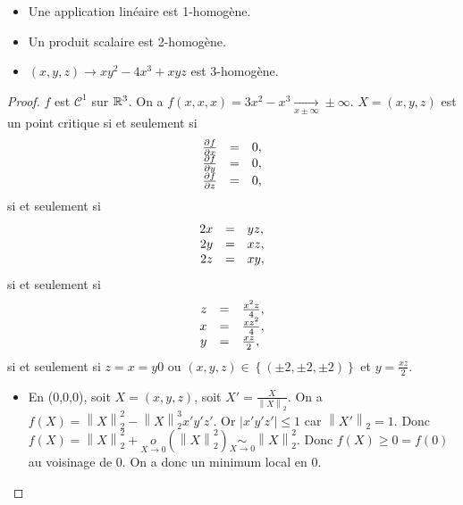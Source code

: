 \documentclass[12pt]{article}
\begin{document}
\begin{remark}
	\phantom{}
	\begin{itemize}
		\item Une application linéaire est 1-homogène.
		\item Un produit scalaire est 2-homogène.
		\item $(x,y,z)\to xy^{2}-4x^{3}+xyz$ est 3-homogène.
	\end{itemize}
\end{remark}

\begin{proof}
	$f$ est $\mathcal{C}^{1}$ sur $\mathbb{R}^{3}$. On a $f(x,x,x)=3x^{2}-x^{3}\xrightarrow[x\pm\infty]{}\pm\infty$. $X=(x,y,z)$ est un point critique si et seulement si 
	\begin{equation}
		\begin{array}[]{rcl}
			\frac{\partial f}{\partial x}&=&0,\\
			\frac{\partial f}{\partial y}&=&0,\\
			\frac{\partial f}{\partial z}&=&0,
		\end{array}
	\end{equation}
	si et seulement si 
	\begin{equation}
		\begin{array}[]{rcl}
			2x &=& yz,\\
			2y &=& xz,\\
			2z &=& xy,			
		\end{array}
	\end{equation}
	si et seulement si 
	\begin{equation}
		\begin{array}[]{rcl}
			z&=&\frac{x^{2}z}{4},\\
			x&=&\frac{xz^{2}}{4},\\
			y&=&\frac{xz}{2},
		\end{array}
	\end{equation}
	si et seulement si $z=x=y0$ ou $(x,y,z)\in\left\lbrace (\pm2,\pm2,\pm2)\right\rbrace$ et $y=\frac{xz}{2}$.

	\begin{itemize}
		\item En (0,0,0), soit $X=(x,y,z)$, soit $X'=\frac{X}{\left\lVert X\right\rVert_{2}}$. On a $f(X)=\left\lVert X\right\rVert_{2}^{2}-\left\lVert X\right\rVert_{2}^{3}x'y'z'$. Or $\left\lvert x'y'z'\right\rvert\leqslant 1$ car $\left\lVert X'\right\rVert_{2}=1$. Donc $f(X)=\left\lVert X\right\rVert_{2}^{2}+\underset{X\to0}{o}\left(\left\lVert X\right\rVert_{2}^{2}\right)\underset{X\to0}{\sim}\left\lVert X\right\rVert_{2}^{2}$. Donc $f(X)\geqslant0=f(0)$ au voisinage de 0. On a donc un minimum local en 0.
		

\end{itemize}
\end{proof}
\end{document}
